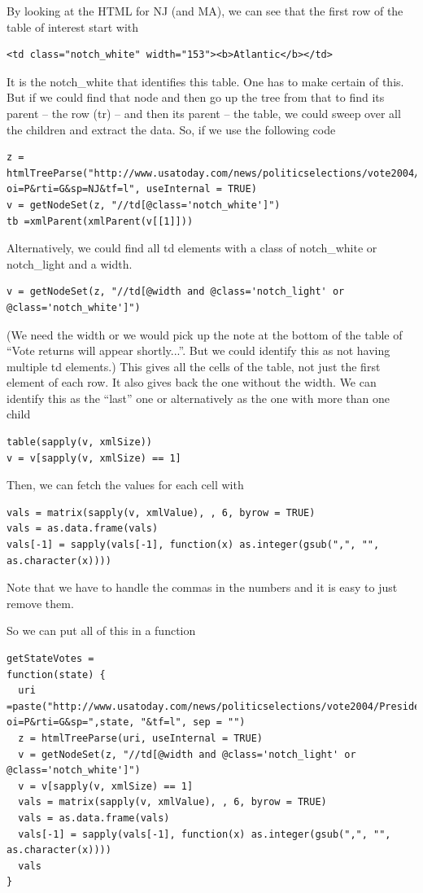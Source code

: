 By looking at the HTML for NJ  (and MA), we can see that the 
first row of the table of interest start with 
\begin{verbatim}
<td class="notch_white" width="153"><b>Atlantic</b></td>
\end{verbatim}
It is the notch_white that identifies this table.
One has to make certain of this.
But if we could find that node and then go up
the tree from that to find its parent -- the row (tr) --
and then its parent -- the table, 
we could sweep over all the children and extract the
data.
So, if we use the following code
\begin{verbatim}
z = htmlTreeParse("http://www.usatoday.com/news/politicselections/vote2004/PresidentialByCounty.aspx?oi=P&rti=G&sp=NJ&tf=l", useInternal = TRUE)
v = getNodeSet(z, "//td[@class='notch_white']")
tb =xmlParent(xmlParent(v[[1]]))
\end{verbatim}
Alternatively, we could find all td elements with
a class of notch_white or notch_light and a width.
\begin{verbatim}
v = getNodeSet(z, "//td[@width and @class='notch_light' or @class='notch_white']")
\end{verbatim}
(We need the width or we would pick up the note at the bottom of
the table of ``Vote returns will appear shortly...''.
But we could identify this as not having multiple td elements.)
This  gives all the cells of the table, not just the first element
of each row.  It also gives back the one without the width.
We can identify this as the ``last'' one or alternatively as the one
with more than one child
\begin{verbatim}
table(sapply(v, xmlSize))
v = v[sapply(v, xmlSize) == 1]
\end{verbatim}
Then, we can fetch the values for each cell with
\begin{verbatim}
vals = matrix(sapply(v, xmlValue), , 6, byrow = TRUE)
vals = as.data.frame(vals)
vals[-1] = sapply(vals[-1], function(x) as.integer(gsub(",", "", as.character(x))))
\end{verbatim}
Note that we have to handle the commas in the numbers
and it is easy to just remove them.

So we can put all of this in a function
\begin{verbatim}
getStateVotes =
function(state) {
  uri =paste("http://www.usatoday.com/news/politicselections/vote2004/PresidentialByCounty.aspx?oi=P&rti=G&sp=",state, "&tf=l", sep = "")
  z = htmlTreeParse(uri, useInternal = TRUE)
  v = getNodeSet(z, "//td[@width and @class='notch_light' or @class='notch_white']")
  v = v[sapply(v, xmlSize) == 1]
  vals = matrix(sapply(v, xmlValue), , 6, byrow = TRUE)
  vals = as.data.frame(vals)
  vals[-1] = sapply(vals[-1], function(x) as.integer(gsub(",", "", as.character(x))))
  vals
}
\end{verbatim}

